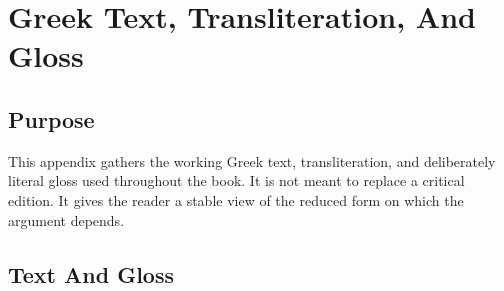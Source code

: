 \chapter{Greek Text, Transliteration, And Gloss}

\section{Purpose}

This appendix gathers the working Greek text, transliteration, and deliberately literal gloss used throughout the book. It is not meant to replace a critical edition. It gives the reader a stable view of the reduced form on which the argument depends.

\section{Text And Gloss}

